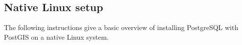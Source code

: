 \subsection{Native Linux setup}
\label{sec:dbinstnl}
The following instructions give a basic overview of installing PostgreSQL with PostGIS on a native Linux system.

